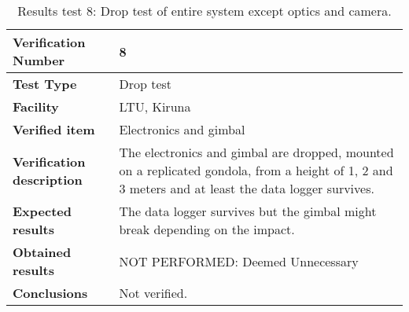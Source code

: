 \begin{table}[H]
\centering

\begin{tabular}{|m{}| m{} |}
\hline
\textbf{Verification Number} 		& 8 				\\ \hline
\textbf{Test Type} 					& Drop test			\\ \hline
\textbf{Facility} 					& LTU, Kiruna 		\\ \hline
\textbf{Verified item} 				& Electronics and gimbal \\ \hline

\textbf{Verification description} 	& The electronics and gimbal are dropped, mounted on a replicated gondola, from a height of 1, 2 and 3 meters and at least the data logger survives. \\ \hline

\textbf{Expected results} 			& The data logger survives but the gimbal might break depending on the impact. \\ \hline

\textbf{Obtained results} 			& NOT PERFORMED: Deemed Unnecessary\\ \hline

\textbf{Conclusions} 				& Not verified.		\\ \hline
\end{tabular}
\caption{Results test 8: Drop test of entire system except optics and camera.}
\label{tab:testresult8:droptest}
\end{table}


\raggedbottom
